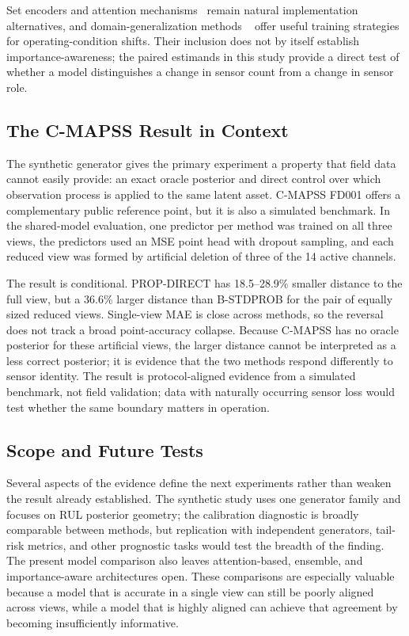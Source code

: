 Set encoders and attention mechanisms~\citep{lee2019settransformer,vaswani2017attention,zaheer2017deep}
remain natural implementation alternatives, and domain-generalization methods
~\citep{ding202322110199,tong202443366689} offer useful training strategies for
operating-condition shifts. Their inclusion does not by itself establish
importance-awareness; the paired estimands in this study provide a direct test of
whether a model distinguishes a change in sensor count from a change in sensor role.

\subsection{The C-MAPSS Result in Context}
\label{sec:limitations}

The synthetic generator gives the primary experiment a property that field data cannot easily provide: an exact oracle posterior and direct control over which observation process is applied to the same latent asset. C-MAPSS FD001 offers a complementary public reference point, but it is also a simulated benchmark. In the shared-model evaluation, one predictor per method was trained on all three views, the predictors used an MSE point head with dropout sampling, and each reduced view was formed by artificial deletion of three of the 14 active channels.

The result is conditional. PROP-DIRECT has 18.5--28.9\% smaller distance to the full view, but a 36.6\% larger distance than B-STDPROB for the pair of equally sized reduced views. Single-view MAE is close across methods, so the reversal does not track a broad point-accuracy collapse. Because C-MAPSS has no oracle posterior for these artificial views, the larger distance cannot be interpreted as a less correct posterior; it is evidence that the two methods respond differently to sensor identity. The result is protocol-aligned evidence from a simulated benchmark, not field validation; data with naturally occurring sensor loss would test whether the same boundary matters in operation.

\subsection{Scope and Future Tests}

Several aspects of the evidence define the next experiments rather than weaken the result already established. The synthetic study uses one generator family and focuses on RUL posterior geometry; the calibration diagnostic is broadly comparable between methods, but replication with independent generators, tail-risk metrics, and other prognostic tasks would test the breadth of the finding. The present model comparison also leaves attention-based, ensemble, and importance-aware architectures open. These comparisons are especially valuable because a model that is accurate in a single view can still be poorly aligned across views, while a model that is highly aligned can achieve that agreement by becoming insufficiently informative.

